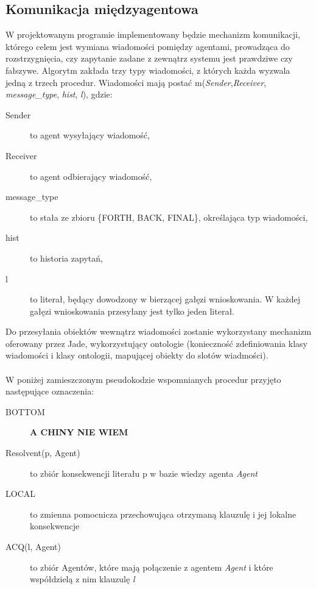 \documentclass[a4paper,12pt]{mwart}
\begin{document}
\subsection{Komunikacja międzyagentowa}
W projektowanym programie implementowany będzie mechanizm komunikacji, którego celem jest wymiana wiadomości pomiędzy agentami, prowadząca do rozstrzygnięcia, czy zapytanie zadane z zewnątrz systemu jest prawdziwe czy fałszywe.
Algorytm zakłada trzy typy wiadomości, z których każda wyzwala jedną z trzech procedur. Wiadomości mają postać m(\textit{Sender},\textit{Receiver}, \textit{message\_type}, \textit{hist}, \textit{l}), gdzie:
\begin{description}
\item[Sender] to agent wysyłający wiadomość,
\item[Receiver] to agent odbierający wiadomość,
\item[message\_type] to stała ze zbioru \{FORTH, BACK, FINAL\}, określająca typ wiadomości,
\item[hist] to historia zapytań,
\item[l] to literał, będący dowodzony w bierzącej gałęzi wnioskowania. W każdej gałęzi wnioskowania przesyłany jest tylko jeden literał.
\end{description}
Do przesyłania obiektów wewnątrz wiadomości zostanie wykorzystany mechanizm oferowany przez Jade, wykorzystujący ontologie (konieczność zdefiniowania klasy wiadomości i klasy ontologii, mapującej obiekty do slotów wiadmości). 
\\\\

W poniżej zamieszczonym pseudokodzie wspomnianych procedur przyjęto następujące oznaczenia:
\begin{description}
\item[BOTTOM] \textbf{A CHINY NIE WIEM}
\item[Resolvent(p, Agent)] to zbiór konsekwencji literału p w bazie wiedzy agenta \textit{Agent}
\item[LOCAL] to zmienna pomocnicza przechowująca otrzymaną klauzulę i jej lokalne konsekwencje
\item[ACQ(l, Agent)] to zbiór Agentów, które mają połączenie z agentem \textit{Agent} i które współdzielą z nim klauzulę \textit{l}
\end{description}
\end{document}
